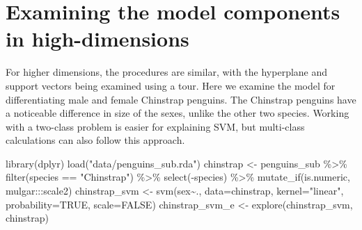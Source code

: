 \documentclass[
  letterpaper,
]{krantz}
\newenvironment{Shaded}{\begin{snugshade}}{\end{snugshade}}
\newcommand{\AttributeTok}[1]{\textcolor[rgb]{0.40,0.45,0.13}{#1}}
\newcommand{\ConstantTok}[1]{\textcolor[rgb]{0.56,0.35,0.01}{#1}}
\newcommand{\FunctionTok}[1]{\textcolor[rgb]{0.28,0.35,0.67}{#1}}
\newcommand{\NormalTok}[1]{\textcolor[rgb]{0.00,0.23,0.31}{#1}}
\newcommand{\OtherTok}[1]{\textcolor[rgb]{0.00,0.23,0.31}{#1}}
\newcommand{\SpecialCharTok}[1]{\textcolor[rgb]{0.37,0.37,0.37}{#1}}
\newcommand{\StringTok}[1]{\textcolor[rgb]{0.13,0.47,0.30}{#1}}
\begin{document}
\hypertarget{examining-the-model-components-in-high-dimensions}{%
\section{Examining the model components in
high-dimensions}\label{examining-the-model-components-in-high-dimensions}}

For higher dimensions, the procedures are similar, with the hyperplane
and support vectors being examined using a tour. Here we examine the
model for differentiating male and female Chinstrap penguins. The
Chinstrap penguins have a noticeable difference in size of the sexes,
unlike the other two species. Working with a two-class problem is easier
for explaining SVM, but multi-class calculations can also follow this
approach.

\begin{Shaded}
\begin{Highlighting}[]
\FunctionTok{library}\NormalTok{(dplyr)}
\FunctionTok{load}\NormalTok{(}\StringTok{"data/penguins\_sub.rda"}\NormalTok{)}
\NormalTok{chinstrap }\OtherTok{\textless{}{-}}\NormalTok{ penguins\_sub }\SpecialCharTok{\%\textgreater{}\%}
  \FunctionTok{filter}\NormalTok{(species }\SpecialCharTok{==} \StringTok{"Chinstrap"}\NormalTok{) }\SpecialCharTok{\%\textgreater{}\%}
  \FunctionTok{select}\NormalTok{(}\SpecialCharTok{{-}}\NormalTok{species) }\SpecialCharTok{\%\textgreater{}\%}
  \FunctionTok{mutate\_if}\NormalTok{(is.numeric, mulgar}\SpecialCharTok{:::}\NormalTok{scale2)}
\NormalTok{chinstrap\_svm }\OtherTok{\textless{}{-}} \FunctionTok{svm}\NormalTok{(sex}\SpecialCharTok{\textasciitilde{}}\NormalTok{., }\AttributeTok{data=}\NormalTok{chinstrap, }
                     \AttributeTok{kernel=}\StringTok{"linear"}\NormalTok{,}
                     \AttributeTok{probability=}\ConstantTok{TRUE}\NormalTok{, }
                     \AttributeTok{scale=}\ConstantTok{FALSE}\NormalTok{)}
\NormalTok{chinstrap\_svm\_e }\OtherTok{\textless{}{-}} \FunctionTok{explore}\NormalTok{(chinstrap\_svm, chinstrap)}
\end{Highlighting}
\end{Shaded}
\end{document}
